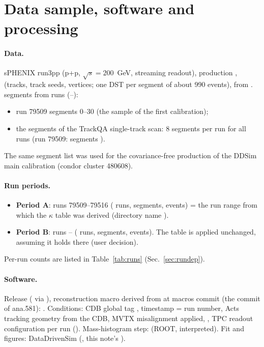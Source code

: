 \section{Data sample, software and processing}
\label{sec:dataset}

\paragraph{Data.} sPHENIX run3pp (p+p, $\sqrt{s}=200$~GeV, streaming readout), production ,
 (tracks, track seeds, vertices; one DST per segment of about 990 events), from
. \PerAllSeg{} segments
from \NRuns{} runs (\RunFirst--\RunLast):
\begin{itemize}
\item run 79509 segments 0--30 (the sample of the first calibration);
\item the segments of the TrackQA single-track scan: 8 segments per run for all \NRuns{} runs (run 79509:
  segments \SegsScanAnine).
\end{itemize}
The same segment list was used for the covariance-free production of the DDSim main calibration (condor cluster 480608).

\paragraph{Run periods.}
\begin{itemize}
\item \textbf{Period A}: runs 79509--79516 (\NRunsA{} runs, \PerASeg{} segments, \PerAEv{} events) = the run range from which
  the $\kappa$ table was derived (directory name ).
\item \textbf{Period B}: runs \RunBFirst--\RunBLast{} (\NRunsB{} runs, \PerBSeg{} segments, \PerBEv{} events). The table is
  applied unchanged, assuming it holds there (user decision).
\end{itemize}
Per-run counts are listed in Table~\ref{tab:runs} (Sec.~\ref{sec:rundep}). \SampleStatus{}

\paragraph{Software.} Release  ( via ),
reconstruction macro derived from  at macros commit 
(the commit of ana.581): . Conditions: CDB global tag ,
timestamp = run number, Acts tracking geometry from the CDB, MVTX misalignment applied, ,
TPC readout configuration per run (). Mass-histogram step: 
(ROOT, interpreted). Fit and figures: DataDrivenSim (, this note's ).

